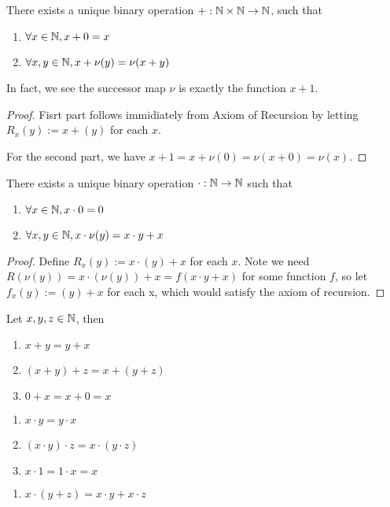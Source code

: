 \documentclass[11pt]{article}
\begin{document}
\begin{proposition}
  There exists a unique binary operation \(+:\mathbb{N} \times \mathbb{N} \rightarrow \mathbb{N}\), such that
  \begin{enumerate}
    \item \(\forall x \in \mathbb{N}, x+0=x\)
    \item \(\forall x,y \in \mathbb{N}, x+\nu (y) = \nu(x+y)\)
  \end{enumerate}
  In fact, we see the successor map \(\nu\) is exactly the function \(x+1\).
\end{proposition}
\begin{proof}
  Fisrt part follows immidiately from Axiom of Recursion by letting \(R_x(y) := x+(y)\) for each \(x\).

  For the second part, we have \(x+1 = x+\nu(0) = \nu(x+0) = \nu(x)\).
\end{proof}

\begin{proposition}
  There exists a unique binary operation \(\cdot: \mathbb{N} \rightarrow \mathbb{N}\) such that
  \begin{enumerate}
    \item \(\forall x\in \mathbb{N}, x \cdot 0 = 0\)
    \item \(\forall x,y \in \mathbb{N}, x \cdot \nu (y) = x \cdot y + x\)
  \end{enumerate}
\end{proposition}
\begin{proof}
  Define \(R_x(y) := x\cdot (y) + x\) for each \(x\). Note we need \(R(\nu(y))=x\cdot(\nu(y))+x= f(x\cdot y +x)\) for some function \(f\), so let \(f_x(y) := (y)+x\) for each x, which would satisfy the axiom of recursion. %
\end{proof}

\begin{proposition}
  Let \(x,y,z \in \mathbb{N}\), then
  \begin{enumerate}[label={\normalfont(A\arabic*)}]
    \item \(x+y=y+x\)
    \item \((x+y)+z=x+(y+z)\)
    \item \(0+x=x+0=x\)
  \end{enumerate}
  \begin{enumerate}[label={\normalfont(M\arabic*)}]
    \item \(x \cdot y = y \cdot x\)
    \item \((x \cdot y) \cdot z = x \cdot (y \cdot z)\)
    \item \(x \cdot 1 = 1 \cdot x = x\)
  \end{enumerate}
  \begin{enumerate}[label={\normalfont(D)}]
    \item \(x \cdot (y+z) = x \cdot y + x \cdot z\)
  \end{enumerate}
\end{proposition}
\end{document}
